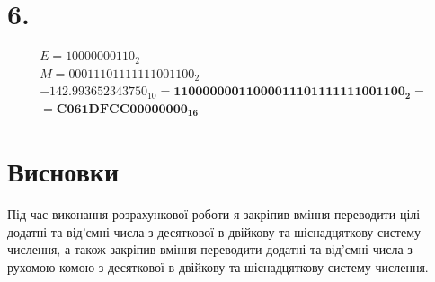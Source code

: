 \documentclass{article}
\begin{document}
\begin{normalsize}
	\section*{6.}
	\begin{Large}
		\begin{gather}
			E = 10000000110_2\nonumber\\
			M = 00011101111111001100_2\nonumber\\
			-142.993652343750_{10} = \boldsymbol{11000000011000011101111111001100_2} = \nonumber\\ = \boldsymbol{C061DFCC00000000_{16}}\nonumber
		\end{gather}
	\end{Large}
	
	\section*{Висновки}
	Під час виконання розрахункової роботи я закріпив вміння переводити цілі додатні та від'ємні числа з десяткової в двійкову та шіснадцяткову систему числення, а також закріпив вміння переводити додатні та від'ємні числа з рухомою комою з десяткової в двійкову та шіснадцяткову систему числення.
	
\end{normalsize}
\end{document}

